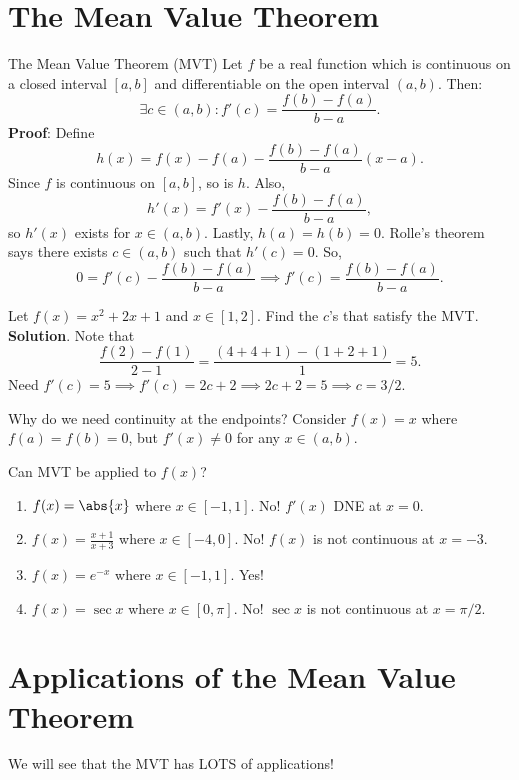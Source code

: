 \section{The Mean Value Theorem}
\begin{Theorem}{The Mean Value Theorem (MVT)}{}
    Let $ f $ be a real function which is continuous on a closed interval
    $ [a,b] $ and differentiable on the open interval $ (a,b) $.\smallskip
    Then:
    \[ \exists c\in(a,b):f'(c)=\frac{f(b)-f(a)}{b-a}. \]
    \tcblower{}
    \textbf{Proof}: Define
    \[ h(x)=f(x)-f(a)-\frac{f(b)-f(a)}{b-a}(x-a). \]
    Since $ f $ is continuous on $ [a,b] $, so is $ h $. Also,
    \[ h'(x)=f'(x)-\frac{f(b)-f(a)}{b-a}, \]
    so $ h'(x) $ exists for $ x\in(a,b) $. Lastly,
    $ h(a)=h(b)=0 $. Rolle's theorem says there exists $ c\in(a,b) $
    such that $ h'(c)=0 $. So,
    \[ 0=f'(c)-\frac{f(b)-f(a)}{b-a}\implies f'(c)=\frac{f(b)-f(a)}{b-a}. \]
\end{Theorem}
\begin{Example}{}{}
    Let $ f(x)=x^2+2x+1 $ and $ x\in[1,2] $. Find the $ c $'s that satisfy the MVT\@.
    \tcblower{}
    \textbf{Solution}. Note that
    \[ \frac{f(2)-f(1)}{2-1}=\frac{(4+4+1)-(1+2+1)}{1}=5. \]
    Need $ f'(c)=5\implies f'(c)=2c+2\implies 2c+2=5\implies c=3/2 $.
\end{Example}
\begin{Remark}{}{}
    Why do we need continuity at the endpoints?
    Consider $ f(x)=x $ where $ f(a)=f(b)=0 $, but $ f'(x)\ne 0 $ for any $ x\in(a,b) $.
\end{Remark}
\begin{Example}{}{}
    Can MVT be applied to $ f(x) $?
    \begin{enumerate}[(1)]
        \item $ f(x)=\abs{x} $ where $ x\in[-1,1] $. No! $ f'(x) $ DNE at $ x=0 $.
        \item $ f(x)=\frac{x+1}{x+3} $ where $ x\in[-4,0] $. No! $ f(x) $ is not continuous at $ x=-3 $.
        \item $ f(x)=e^{-x} $ where $ x\in[-1,1] $. Yes!
        \item $ f(x)=\sec x $ where $ x\in[0,\pi] $. No! $ \sec x $ is not continuous at $ x=\pi/2 $.
    \end{enumerate}
\end{Example}
\section{Applications of the Mean Value Theorem}
We will see that the MVT has LOTS of applications!
